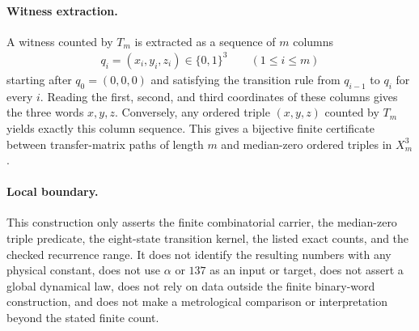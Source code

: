\paragraph{Witness extraction.}
A witness counted by $T_m$ is extracted as a sequence of $m$ columns
$$
\begin{aligned}
q_i=(x_i,y_i,z_i)\in \{0,1\}^3\qquad (1\leq i\leq m)
\end{aligned}
$$
starting after $q_0=(0,0,0)$ and satisfying the transition rule from $q_{i-1}$ to $q_i$ for every $i$. Reading the first, second, and third coordinates of these columns gives the three words $x,y,z$. Conversely, any ordered triple $(x,y,z)$ counted by $T_m$ yields exactly this column sequence. This gives a bijective finite certificate between transfer-matrix paths of length $m$ and median-zero ordered triples in $X_m^3$.

\paragraph{Local boundary.}
This construction only asserts the finite combinatorial carrier, the median-zero triple predicate, the eight-state transition kernel, the listed exact counts, and the checked recurrence range. It does not identify the resulting numbers with any physical constant, does not use $\alpha$ or $137$ as an input or target, does not assert a global dynamical law, does not rely on data outside the finite binary-word construction, and does not make a metrological comparison or interpretation beyond the stated finite count.
